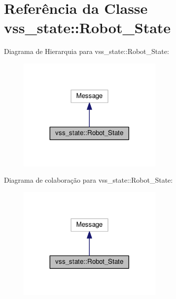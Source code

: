 \hypertarget{classvss__state_1_1Robot__State}{}\section{Referência da Classe vss\+\_\+state\+:\+:Robot\+\_\+\+State}
\label{classvss__state_1_1Robot__State}


Diagrama de Hierarquia para vss\+\_\+state\+:\+:Robot\+\_\+\+State\+:\nopagebreak
\begin{figure}[H]
\begin{center}
\leavevmode
\includegraphics[width=200pt]{classvss__state_1_1Robot__State__inherit__graph}
\end{center}
\end{figure}


Diagrama de colaboração para vss\+\_\+state\+:\+:Robot\+\_\+\+State\+:\nopagebreak
\begin{figure}[H]
\begin{center}
\leavevmode
\includegraphics[width=200pt]{classvss__state_1_1Robot__State__coll__graph}
\end{center}
\end{figure}
